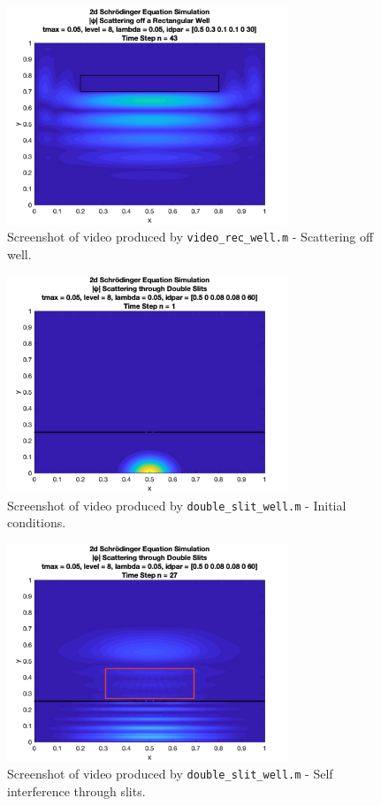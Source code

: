 \documentclass[10pt]{article}
\def\code#1{\texttt{#1}} %
\begin{document}
\begin{figure}[H]
\centering
\includegraphics[width=0.75\textwidth]{problem2/rec_well_2.png}
\caption{Screenshot of video produced by \code{video\_rec\_well.m} - Scattering off well.}
\end{figure}

\begin{figure}[H]
\centering
\includegraphics[width=0.75\textwidth]{problem2/double_slit_1.png}
\caption{Screenshot of video produced by \code{double\_slit\_well.m} - Initial conditions.}
\end{figure}

\begin{figure}[H]
\centering
\includegraphics[width=0.75\textwidth]{problem2/double_slit_2.png}
\caption{Screenshot of video produced by \code{double\_slit\_well.m} - 
Self interference through slits.}
\end{figure}
\end{document}
